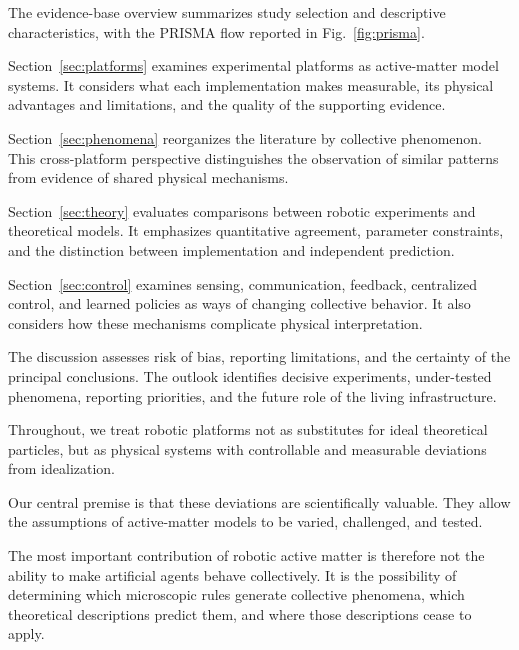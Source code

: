 The evidence-base
overview summarizes
study selection
and descriptive
characteristics,
with the
PRISMA flow
reported in
Fig.~\ref{fig:prisma}.

Section~\ref{sec:platforms}
examines experimental
platforms as
active-matter
model systems.
It considers
what each
implementation
makes measurable,
its physical
advantages and
limitations,
and the
quality of
the supporting
evidence.

Section~\ref{sec:phenomena}
reorganizes the
literature by
collective phenomenon.
This cross-platform
perspective distinguishes
the observation
of similar
patterns from
evidence of
shared physical
mechanisms.

Section~\ref{sec:theory}
evaluates comparisons
between robotic
experiments and
theoretical models.
It emphasizes
quantitative agreement,
parameter constraints,
and the distinction
between implementation
and independent
prediction.

Section~\ref{sec:control}
examines sensing,
communication,
feedback,
centralized control,
and learned
policies as
ways of
changing
collective behavior.
It also considers
how these
mechanisms complicate
physical interpretation.

The discussion
assesses risk
of bias,
reporting limitations,
and the
certainty of
the principal
conclusions.
The outlook
identifies decisive
experiments,
under-tested
phenomena,
reporting priorities,
and the future
role of the
living infrastructure.

Throughout,
we treat
robotic platforms
not as substitutes
for ideal
theoretical particles,
but as physical
systems with
controllable and
measurable deviations
from idealization.

Our central
premise is
that these
deviations are
scientifically
valuable.
They allow
the assumptions
of active-matter
models to
be varied,
challenged,
and tested.

The most
important contribution
of robotic
active matter
is therefore
not the
ability to
make artificial
agents behave
collectively.
It is the
possibility
of determining
which microscopic
rules generate
collective phenomena,
which theoretical
descriptions predict
them, and
where those
descriptions
cease to
apply.